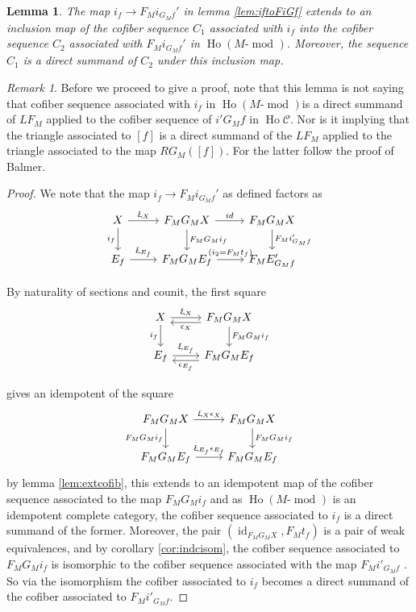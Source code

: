 \documentclass{article}
\newcommand{\cC}{\mathcal{C}}
\newcommand{\module}[2][]{#2\text{-}\modop_{#1}}
\DeclareMathOperator{\Ho}{Ho}
\DeclareMathOperator{\id}{id}
\DeclareMathOperator{\modop}{mod}
\newtheorem{lemma}[theorem]{Lemma}
\theoremstyle{definition}
\theoremstyle{remark}
\newtheorem{remark}[theorem]{Remark}
\begin{document}
\begin{lemma} \label{lem:dirincof}
The map $i_{f} \rightarrow F_{M}i_{G_{M}f}'$ in lemma \ref{lem:iftoFiGf} extends to an inclusion map
of the cofiber sequence $C_1$ associated with $i_{f}$ into the cofiber sequence $C_2$ associated with
$F_{M}i_{G_{M}f}'$ in $\Ho(\module{M})$. Moreover, the sequence $C_1$ is a direct summand of $C_2$ under this inclusion map.
\end{lemma}
\begin{remark}
    Before we proceed to give a proof, note that this lemma is not saying that cofiber sequence associated with $i_{f}$ in $\Ho(\module{M})$is a direct summand of $L F_{M}$ applied to the cofiber sequence of $i'G_{M}f$ in $\Ho \cC$. Nor is it implying that the triangle associated to $[f]$ is a direct summand of the $LF_{M}$ applied to the triangle associated to the map $RG_{M}([f])$. For the latter follow the proof of Balmer.
\end{remark}
\begin{proof}
We note that the map $i_{f} \rightarrow F_{M}i_{G_{M}f}'$ as defined factors as 
    \[\begin{tikzcd}
         X \arrow{r}{\upxi_{X}} \arrow[swap]{d}{i_{f}} & F_{M}G_{M}X \arrow{d}{F_{M}G_{M}i_{f}} \arrow{r}{id} & F_{M}G_{M}X \arrow{d}{F_{M}i'_{G_{M}f}}  \\
         E_{f} \arrow{r}{\upxi_{E_{f}}} & F_{M}G_{M}E_{f} \arrow{r} {(i_{2}=F_{M}t_{f})} & F_{M}E'_{G_{M}f} 
    \end{tikzcd}\]

By naturality of sections and counit, the first square \[\begin{tikzcd}
         X \arrow{r}{\upxi_{X}} \arrow[swap]{d}{i_{f}} & F_{M}G_{M}X \arrow{d}{F_{M}G_{M}i_{f}} \arrow[l,"\epsilon_{X}",shift left=1ex]   \\
         E_{f} \arrow{r}{\upxi_{E_{f}}} & F_{M}G_{M}E_{f}  \arrow[l,"\epsilon_{E_{f}}",shift left=1ex]
    \end{tikzcd}\]   

gives an idempotent of the square
\[\begin{tikzcd}
         F_{M}G_{M}X \arrow{r}{\upxi_{X}\epsilon_{X}} \arrow[swap]{d}{F_{M}G_{M}i_{f}} & F_{M}G_{M}X \arrow{d}{F_{M}G_{M}i_{f}}    \\
         F_{M}G_{M}E_{f} \arrow{r}{\upxi_{E_{f}}\epsilon_{E_{f}}} & F_{M}G_{M}E_{f}  
    \end{tikzcd}\] 
by lemma \ref{lem:extcofib}, this extends to an idempotent map of the cofiber sequence associated to the map $F_{M}G_{M}i_{f}$ and as $\Ho(\module{M})$ is an 
idempotent complete category, the cofiber sequence associated to $i_{f}$ is a direct summand of the former. Moreover, the pair 
$(\id_{F_{M}G_{M}X}, F_{M}t_{f})$ is a pair of weak equivalences, and by corollary \ref{cor:indcisom}, the cofiber sequence associated to $F_{M}G_{M}i_{f}$ is 
isomorphic to the cofiber sequence associated with the map $F_{M}i'_{G_{M}f}$ . So via the isomorphism the cofiber associated to $i_{f}$ becomes a direct summand of 
the cofiber associated to $F_{M}i'_{G_{M}f}$.
\end{proof}
\end{document}
